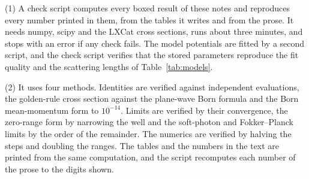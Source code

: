 \documentclass[11pt]{article}
\numberwithin{equation}{section}
\begin{document}
{\noindent}(1) A check script computes every boxed result of these notes and
reproduces every number printed in them, from the tables it writes and from
the prose. It needs numpy, scipy and the LXCat cross sections, runs about
three minutes, and stops with an error if any check fails. The model
potentials are fitted by a second script, and the check script verifies that
the stored parameters reproduce the fit quality and the scattering lengths of
Table~\ref{tab:models}.

{\noindent}(2) It uses four methods. Identities are verified against
independent evaluations, the golden-rule cross section against the plane-wave
Born formula and the Born mean-momentum form to $10^{-14}$. Limits are
verified by their convergence, the zero-range form by narrowing the well and
the soft-photon and Fokker--Planck limits by the order of the remainder. The
numerics are verified by halving the steps and doubling the ranges. The tables
and the numbers in the text are printed from the same computation, and the
script recomputes each number of the prose to the digits shown.


\end{document}
